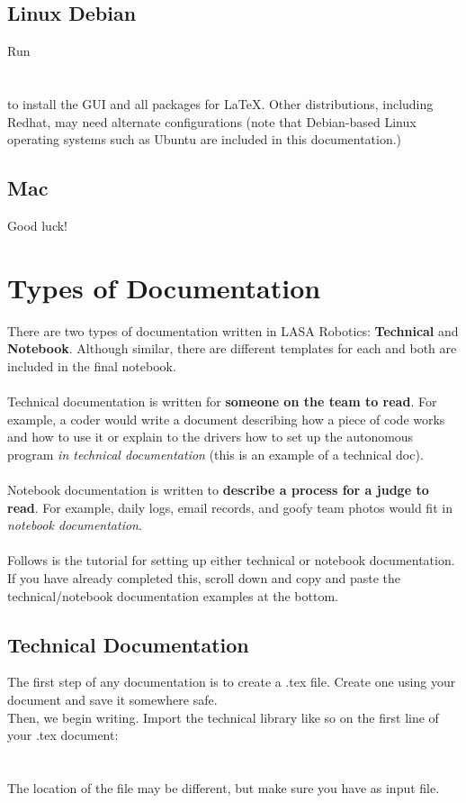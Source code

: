 \subsection{Linux Debian}
Run \\\\\\ to install the GUI and all packages for \LaTeX{}.  Other distributions, including Redhat, may need alternate configurations (note that Debian-based Linux operating systems such as Ubuntu are included in this documentation.)

\subsection{Mac}
Good luck!

\newpage

\section{Types of Documentation}
There are two types of documentation written in LASA Robotics: \textbf{Technical} and \textbf{Notebook}. Although similar, there are different templates for each and both are included in the final notebook.\\\\
Technical documentation is written for \textbf{someone on the team to read}. For example, a coder would write a document describing how a piece of code works and how to use it or explain to the drivers how to set up the autonomous program \emph{in technical documentation} (this is an example of a technical doc).\\\\
Notebook documentation is written to \textbf{describe a process for a judge to read}.  For example, daily logs, email records, and goofy team photos would fit in \emph{notebook documentation}.\\\\
Follows is the tutorial for setting up either technical or notebook documentation.  If you have already completed this, scroll down and copy and paste the technical/notebook documentation examples at the bottom.

\subsection{Technical Documentation}
The first step of any documentation is to create a .tex file.  Create one using your document and save it somewhere safe.\\
Then, we begin writing.  Import the technical library like so on the first line of your .tex document: \\\\\\ The location of the file may be different, but make sure you have  as input file.


